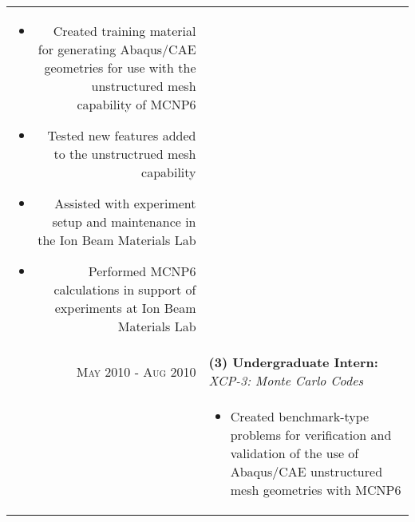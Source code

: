 \begin{tabular}{r|p{15cm}}
{\begin{itemize}[leftmargin=4mm]
	  \item Created training material for generating Abaqus/CAE geometries for
		use with the unstructured mesh capability of MCNP6
	  \item Tested new features added to the unstructrued mesh capability
	  \item Assisted with experiment setup and maintenance in the Ion Beam
		Materials Lab
	  \item Performed MCNP6 calculations in support of experiments at Ion Beam Materials Lab

	\end{itemize}
 \vspace{-2.0mm}  
 } \\
 
  \textsc{May 2010 - Aug 2010}  & \textbf{(3) Undergraduate Intern:} \textit{XCP-3: Monte Carlo Codes} \\
                           	& \small{ \vspace{-2.0mm} 
				  \begin{itemize}[leftmargin=4mm]
					\item Created benchmark-type problems for verification and
					  validation of the use of Abaqus/CAE unstructured mesh
					  geometries with MCNP6
 

\end{itemize}}
\end{tabular}

